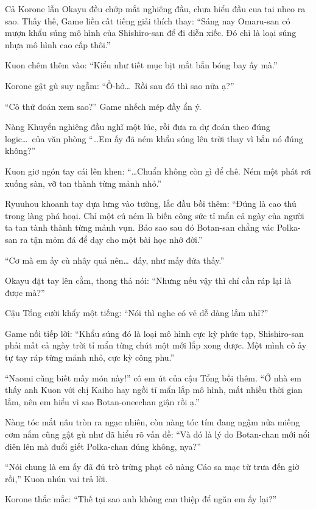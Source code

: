 \documentclass[../main.tex]{subfiles}
\begin{document}
Cả Korone lẫn Okayu đều chớp mắt nghiêng đầu, chưa hiểu đầu cua tai nheo ra sao. Thấy thế, Game liền cất tiếng giải thích thay: ``Sáng nay Omaru-san có mượn khẩu súng mô hình của Shishiro-san để đi diễn xiếc. Đó chỉ là loại súng nhựa mô hình cao cấp thôi.''

Kuon chêm thêm vào: ``Kiểu như tiết mục bịt mắt bắn bóng bay ấy mà.''

Korone gật gù suy ngẫm: ``Ồ-hớ\dots\ Rồi sau đó thì sao nữa ạ?''

``Cô thử đoán xem sao?'' Game nhếch mép đầy ẩn ý.

Nàng Khuyển nghiêng đầu nghĩ một lúc, rồi đưa ra dự đoán theo đúng logic\dots\ của văn phòng \hll\: ``\dots Em ấy đã ném khẩu súng lên trời thay vì bắn nó đúng không?''

Kuon giơ ngón tay cái lên khen: ``\dots Chuẩn không còn gì để chê. Ném một phát rơi xuống sàn, vỡ tan thành từng mảnh nhỏ.''

Ryuuhou khoanh tay dựa lưng vào tường, lắc đầu bồi thêm: ``Đúng là cao thủ trong làng phá hoại. Chỉ một cú ném là biến công sức tỉ mẩn cả ngày của người ta tan tành thành từng mảnh vụn. Bảo sao sau đó Botan-san chẳng vác Polka-san ra tận mỏm đá để dạy cho một bài học nhớ đời.''

``Cơ mà em ấy cù nhây quá nên\dots\ đấy, như mấy đứa thấy.''

Okayu đặt tay lên cằm, thong thả nói: ``Nhưng nếu vậy thì chỉ cần ráp lại là được mà?''

Cậu Tổng cười khẩy một tiếng: ``Nói thì nghe có vẻ dễ dàng lắm nhỉ?''

Game nối tiếp lời: ``Khẩu súng đó là loại mô hình cực kỳ phức tạp, Shishiro-san phải mất cả ngày trời tỉ mẩn từng chút một mới lắp xong được. Một mình cô ấy tự tay ráp từng mảnh nhỏ, cực kỳ công phu.''

``Naomi cũng biết mấy món này!'' cô em út của cậu Tổng bồi thêm. ``Ở nhà em thấy anh Kuon với chị Kaiho hay ngồi tỉ mẩn lắp mô hình, mất nhiều thời gian lắm, nên em hiểu vì sao Botan-oneechan giận rồi ạ.''

Nàng tóc mắt nâu tròn ra ngạc nhiên, còn nàng tóc tím đang ngậm nửa miếng cơm nắm cũng gật gù như đã hiểu rõ vấn đề: ``Và đó là lý do Botan-chan mới nổi điên lên mà đuổi giết Polka-chan đúng không, nya?''

``Nói chung là em ấy đã đủ trò trừng phạt cô nàng Cáo sa mạc từ trưa đến giờ rồi,'' Kuon nhún vai trả lời.

Korone thắc mắc: ``Thế tại sao anh không can thiệp để ngăn em ấy lại?''
\end{document}
